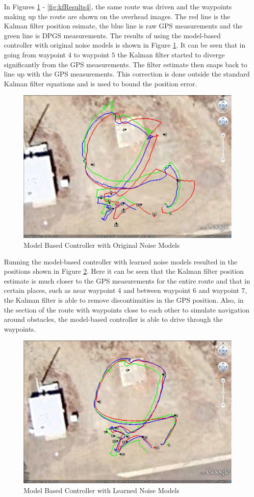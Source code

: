 In Figures \ref{fig:kfResults1} - \ref{fig:kfResults4}, the same route was driven and the waypoints making up the route are shown on the overhead images. The red line is the Kalman filter position esimate, the blue line is raw GPS measurements and the green line is DPGS measurements. The results of using the model-based controller with original noise models is shown in Figure \ref{fig:kfResults1}. It can be seen that in going from waypoint $4$ to waypoint $5$ the Kalman filter started to diverge significantly from the GPS measurements. The filter estimate then snaps back to line up with the GPS measurements. This correction is done outside the standard Kalman filter equations and is used to bound the position error.

\begin{figure}[ht!]
	\centering
	\includegraphics[width=.75\textwidth]{images/GE/20101203_1551_kf_lyapOrigQR}
	\caption{Model Based Controller with Original Noise Models}
	\label{fig:kfResults1}
\end{figure}

Running the model-based controller with learned noise models resulted in the positions shown in Figure \ref{fig:kfResults2}. Here it can be seen that the Kalman filter position estimate is much closer to the GPS measurements for the entire route and that in certain places, such as near waypoint $4$ and between waypoint $6$ and waypoint $7$, the Kalman filter is able to remove discontinuities in the GPS position. Also, in the section of the route with waypoints close to each other to simulate navigation around obstacles, the model-based controller is able to drive through the waypoints.

\begin{figure}[ht!]
	\centering
	\includegraphics[width=.75\textwidth]{images/GE/20101203_1545_kf_lyapNewQR}
	\caption{Model Based Controller with Learned Noise Models}
	\label{fig:kfResults2}
\end{figure}

